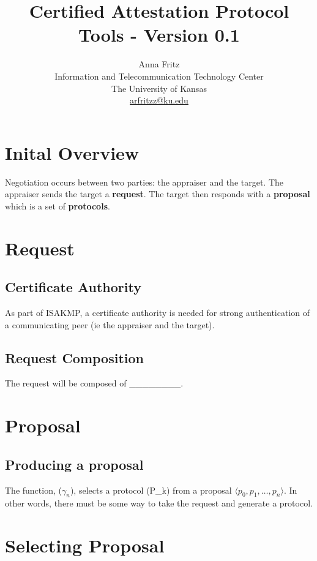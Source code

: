 \documentclass[10pt]{report}
\begin{document}
\title{Certified Attestation Protocol Tools - Version 0.1}
\author{Anna Fritz \\
  Information and Telecommunication Technology Center \\
  The University of Kansas \\
  \url{arfritzz@ku.edu}
}

\section {Inital Overview}

  Negotiation occurs between two parties: the appraiser and the target. 
  The appraiser sends the target a \textbf{request}. The target then responds
  with a \textbf{proposal} which is a set of \textbf{protocols}.

\section {Request}

\subsection {Certificate Authority}
  
  As part of ISAKMP, a certificate authority is needed for strong 
  authentication of a communicating peer (ie the appraiser and the
  target). 

\subsection {Request Composition}
  
  The request will be composed of ________. 

\section {Proposal}

\subsection {Producing a proposal}

  The function, ($\gamma_{n}$), selects a protocol (P_{k}) from a proposal
  $\langle p_0,p_1,\ldots,p_n\rangle$. In other words, there must be some
  way to take the request and generate a protocol. 
   
\section {Selecting Proposal}
\end{document}

